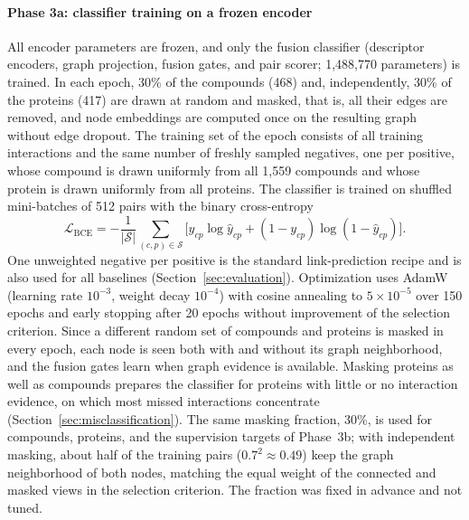 \documentclass[11pt,letterpaper]{article}
\begin{document}
\paragraph{Phase 3a: classifier training on a frozen encoder}
All encoder parameters are frozen, and only the fusion classifier (descriptor encoders, graph projection, fusion gates, and pair scorer; 1,488,770 parameters) is trained. In each epoch, 30\% of the compounds (468) and, independently, 30\% of the proteins (417) are drawn at random and masked, that is, all their edges are removed, and node embeddings are computed once on the resulting graph without edge dropout. The training set of the epoch consists of all training interactions and the same number of freshly sampled negatives, one per positive, whose compound is drawn uniformly from all 1,559 compounds and whose protein is drawn uniformly from all proteins. The classifier is trained on shuffled mini-batches of 512 pairs with the binary cross-entropy
\begin{equation}
\mathcal{L}_{\text{BCE}} = -\frac{1}{|\mathcal{S}|}\sum_{(c,p)\in\mathcal{S}} \Big[ y_{cp}\log\hat{y}_{cp} + (1-y_{cp})\log(1-\hat{y}_{cp}) \Big].
\end{equation}
One unweighted negative per positive is the standard link-prediction recipe and is also used for all baselines (Section~\ref{sec:evaluation}). Optimization uses AdamW (learning rate $10^{-3}$, weight decay $10^{-4}$) with cosine annealing to $5\times 10^{-5}$ over 150 epochs and early stopping after 20 epochs without improvement of the selection criterion. Since a different random set of compounds and proteins is masked in every epoch, each node is seen both with and without its graph neighborhood, and the fusion gates learn when graph evidence is available. Masking proteins as well as compounds prepares the classifier for proteins with little or no interaction evidence, on which most missed interactions concentrate (Section~\ref{sec:misclassification}). The same masking fraction, 30\%, is used for compounds, proteins, and the supervision targets of Phase~3b; with independent masking, about half of the training pairs ($0.7^2\approx0.49$) keep the graph neighborhood of both nodes, matching the equal weight of the connected and masked views in the selection criterion. The fraction was fixed in advance and not tuned.
\end{document}
